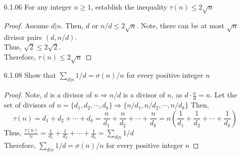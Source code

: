 \documentclass[12pt]{article}
\begin{document}
\begin{enumerate}
	\item[6.1.06] For any integer $ n \geq 1 $, establish the inequality $ \tau(n)\leq2\sqrt{n} $
	\begin{proof}
		Assume $ d | n $. Then, $ d $ or $ n/d \leq 2\sqrt{n}$. Note, there can be at most $ \sqrt{n} $ divisor pairs $ (d,n/d) $. \\
		Thus, $ \sqrt{2} \leq 2\sqrt{2} $.\\
		Therefore, $\tau(n)\leq2\sqrt{n} $
	\end{proof}
	\item[6.1.08] Show that $ \sum_{d|n} 1/d =\sigma(n)/n $ for every positive integer $ n $
	\begin{proof}
		Note, $ d $ is a divisor of $ n \Rightarrow n/d $ is a divisor of $ n $, as $ d\cdot \frac{n}{d}=n $. Let the set of divisors of $ n = \{d_1,d_2,\cdots,d_k\} \Rightarrow \{n/d_1,n/d_2,\cdots,n/d_k\} $ Then,
		\[\tau(n)=d_1+d_2+\cdots+d_k=\frac{n}{d_1}+\frac{n}{d_2}+\cdots+\frac{n}{d_k}=n(\frac{1}{d_1}+\frac{1}{d_2}+\cdots+\frac{1}{d_k})\]
		Thus, $ \frac{\tau(n)}{n}=\frac{1}{d_1}+\frac{1}{d_2}+\cdots+\frac{1}{d_k} = \sum_{d|n} 1/d $\\
		Therefore, $ \sum_{d|n} 1/d =\sigma(n)/n $ for every positive integer $ n $
	\end{proof}
	

\end{enumerate}
\end{document}
